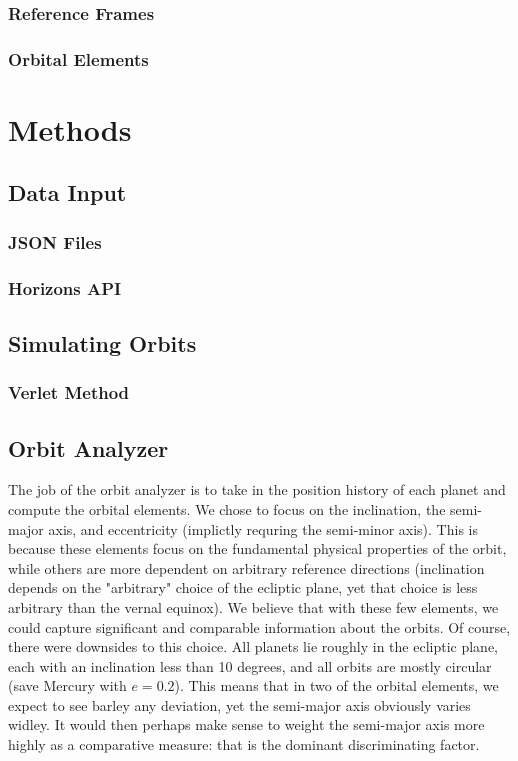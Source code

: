 \documentclass[a4paper,12pt]{article} %
\numberwithin{equation}{section} %
\numberwithin{figure}{section} %
\begin{document}
\subsubsection{Reference Frames}

\subsubsection{Orbital Elements}

\section{Methods}

\subsection{Data Input}

\subsubsection{JSON Files}

\subsubsection{Horizons API}


\subsection{Simulating Orbits}

\subsubsection{Verlet Method}


\subsection{Orbit Analyzer}

The job of the orbit analyzer is to take in the position history of each planet and compute the orbital elements. We chose to focus on the inclination, the semi-major axis, and eccentricity (implictly requring the semi-minor axis). This is because these elements focus on the fundamental physical properties of the orbit, while others are more dependent on arbitrary reference directions (inclination depends on the "arbitrary" choice of the ecliptic plane, yet that choice is less arbitrary than the vernal equinox). We believe that with these few elements, we could capture significant and comparable information about the orbits. Of course, there were downsides to this choice. All planets lie roughly in the ecliptic plane, each with an inclination less than 10 degrees, and all orbits are mostly circular (save Mercury with $e=0.2$). This means that in two of the orbital elements, we expect to see barley any deviation, yet the semi-major axis obviously varies widley. It would then perhaps make sense to weight the semi-major axis more highly as a comparative measure: that is the dominant discriminating factor.
\end{document}

